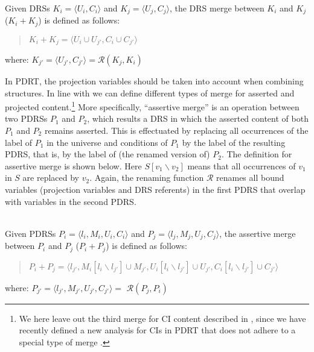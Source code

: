\begin{definition}\label{def:DRSmerge}~\\
Given DRSs $K_i=\langle U_i,C_i \rangle$ and $K_j=\langle U_j,C_j \rangle$,
the DRS merge between $K_i$ and $K_j$ ($K_i + K_j$) is defined as follows:
  \begin{quote}
    $K_i + K_j = 
    \langle U_i\cup U_{j'},C_i \cup C_{j'}\rangle$
  \end{quote}
  where: $K_{j'} = \langle U_{j'},C_{j'} \rangle = \mathcal{R}(K_j,K_i)$
\end{definition}

In PDRT, the projection variables should be taken into account when
combining structures.  In line with  we can
define different types of merge for asserted and projected
content.\footnote{We here leave out the third merge for CI content described
in , since we have recently defined a new
analysis for CIs in PDRT that does not adhere to a special type of merge
\cite{venhuizenInPrepSALT}.} More specifically, ``assertive merge'' is an
operation between two PDRSs $P_1$ and $P_2$, which results a DRS in which
the asserted content of both $P_1$ and $P_2$ remains asserted. This is
effectuated by replacing all occurrences of the label of $P_1$ in the
universe and conditions of $P_1$ by the label of the resulting PDRS, that
is, by the label of (the renamed version of) $P_2$. The definition for
assertive merge is shown below. Here $S[v_1\backslash v_2]$ means that all
occurrences of $v_1$ in $S$ are replaced by $v_2$. Again, the renaming
function $\mathcal{R}$ renames all bound variables (projection variables and
DRS referents) in the first PDRS that overlap with variables in the second
PDRS.

\begin{definition}\label{def:amerge}~\\
Given PDRSs $P_i=\langle l_i,M_i,U_i,C_i \rangle$ and
$P_j=\langle l_j,M_j,U_j,C_j \rangle$, the assertive merge between $P_i$
and $P_j$ ($P_i + P_j$) is defined as follows:
  \begin{quote}
    $P_i + P_j = 
      \langle l_{j'}, 
      M_{i}[l_i\backslash l_{j'}] \cup M_{j'},
      U_{i}[l_i\backslash l_{j'}] \cup U_{j'},
      C_{i}[l_i\backslash l_{j'}] \cup C_{j'}\rangle$
  \end{quote}
  where: $P_{j'} = \langle l_{j'}, M_{j'}, U_{j'}, C_{j'} \rangle =$
      $\mathcal{R}(P_j,P_i)$
\end{definition}

